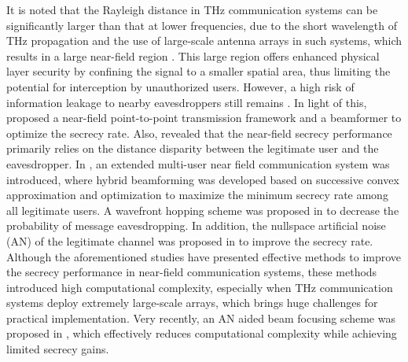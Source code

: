 \documentclass[10pt,technote]{IEEEtran}
\newcommand{\1}{\mathbbm{1}}
\begin{document}
It is noted that the Rayleigh distance in THz communication systems can be significantly larger than that at lower frequencies, due to the short wavelength of THz propagation and the use of large-scale antenna arrays in such systems, which results in a large near-field region \cite{Bodet2024}. This large region offers enhanced physical layer security by confining the signal to a smaller spatial area, thus limiting the potential for interception by unauthorized users. However, a high risk of information leakage to nearby eavesdroppers still remains \cite{Ferreira2024access}.
In light of this, \cite{Zhang2024tvt} proposed a near-field point-to-point transmission framework and a beamformer to optimize the secrecy rate. Also, \cite{Zhang2024tvt} revealed that the near-field secrecy performance primarily relies on the distance disparity between the legitimate user and the eavesdropper. In \cite{Ali2024coml}, an extended multi-user near field communication system was introduced, where hybrid beamforming was developed based on successive convex approximation and optimization to maximize the minimum secrecy rate among all legitimate users. A wavefront hopping scheme was proposed in \cite{Petrov2024tcom} to decrease the probability of message eavesdropping. In addition, the nullspace artificial noise (AN) of the legitimate channel was proposed in \cite{Chen2024tvt} to improve the secrecy rate. Although the aforementioned studies have presented effective methods to improve the secrecy performance in near-field communication systems, these methods introduced high computational complexity, especially when THz communication systems deploy extremely large-scale arrays, which brings huge challenges for practical implementation. Very recently, an AN aided beam focusing scheme was proposed in \cite{zhang2024performanceanalysislowcomplexitybeamforming}, which effectively reduces computational complexity while achieving limited secrecy gains. 
\end{document}
